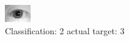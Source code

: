 \begin{figure}[h!]
\begin{center}
\includegraphics[width=0.60\columnwidth]{figures/ID1155_class_2_target_3.png}
\end{center}
\caption{ Classification: 2 actual target: 3}
\label{fig:ID1155_class_2_target_3}
\end{figure}
